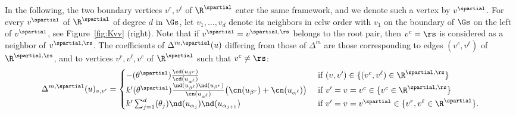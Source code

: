 \documentclass[a4paper,twoside,11pt]{article}
\begin{document}
In the following, the two boundary vertices $v^r,v^\ell$ of $\R^\spartial$
enter the same framework, and we denote such a vertex by $v^\spartial$. For every $v^\spartial$ of $\R^\spartial$ of degree $d$ in $\Gs$,
let $v_1,\dots,v_d$ denote its neighbors in cclw order with
$v_1$ on the boundary of $\Gs$ on the left of $v^\spartial$, see Figure~\ref{fig:Kvv} (right). Note that if $v^\spartial=v^{\spartial,\rs}$ belongs to the 
root pair, then $v^c=\rs$ is considered as a neighbor of $v^{\spartial,\rs}$. 
% 
The coefficients of $\Delta^{m,\spartial}(u)$ differing from those of $\Delta^m$ are those corresponding to edges $(v^c,v^\ell)$
of $\R^{\spartial,\rs}$, and to vertices $v^r,v^\ell,v^c$ of $\R^\spartial$ such that $v^c\neq \rs$:
\begin{equation}\label{equ:def_Lap_bry}
\Delta^{m,\spartial}(u)_{v,v'}=
\begin{cases}
-\sc(\theta^\spartial)\frac{\cd(u_{\beta^r})}{\cd(u_{\alpha^\ell})}&
     \text{ if $(v,v')\in\{(v^c,v^\ell)\in \R^{\spartial,\rs}\}$}\\
k'\sc(\theta^\spartial)
\frac{\nd(u_{\beta^\ell})\nd(u_{\beta^r})}{\cn(u_{\alpha^\ell})}\bigl(\cn(u_{\beta^r})+\cn(u_{\alpha^\ell})\bigr)
&\text{ if $v'=v=v^c\in\{v^c\in \R^{\spartial,\rs}\}$}\\
k'\sum_{j=1}^d \sc(\theta_j)\nd(u_{\alpha_j})\nd(u_{\alpha_{j+1}})&\text{ if $v'=v=v^\spartial\in\{v^r,v^\ell\in\R^\spartial\}$}.
\end{cases}
\end{equation}
\end{document}
